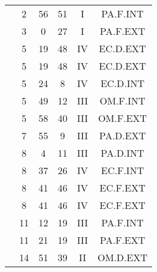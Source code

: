 \documentclass[12pt, a4paper]{article}
\begin{document}
\begin{multicols}{3}
{\begin{tabular}{c c c c c c}
	 	 	 	 & 2 & 56 & 51 & I & PA.F.INT\\%
	 	 	 	 & 3 & 0 & 27 & I & PA.F.EXT\\%
	 	 	 	 & 5 & 19 & 48 & IV & EC.D.EXT\\%
	 	 	 	 & 5 & 19 & 48 & IV & EC.D.EXT\\%
	 	 	 	 & 5 & 24 & 8 & IV & EC.D.INT\\%
	 	 	 	 & 5 & 49 & 12 & III & OM.F.INT\\%
	 	 	 	 & 5 & 58 & 40 & III & OM.F.EXT\\%
	 	 	 	 & 7 & 55 & 9 & III & PA.D.EXT\\%
	 	 	 	 & 8 & 4 & 11 & III & PA.D.INT\\%
	 	 	 	 & 8 & 37 & 26 & IV & EC.F.INT\\%
	 	 	 	 & 8 & 41 & 46 & IV & EC.F.EXT\\%
	 	 	 	 & 8 & 41 & 46 & IV & EC.F.EXT\\%
	 	 	 	 & 11 & 12 & 19 & III & PA.F.INT\\%
	 	 	 	 & 11 & 21 & 19 & III & PA.F.EXT\\%
	 	 	 	 & 14 & 51 & 39 & II & OM.D.EXT\\%
	 	 \end{tabular}
 	}
\end{multicols}
\end{document}
